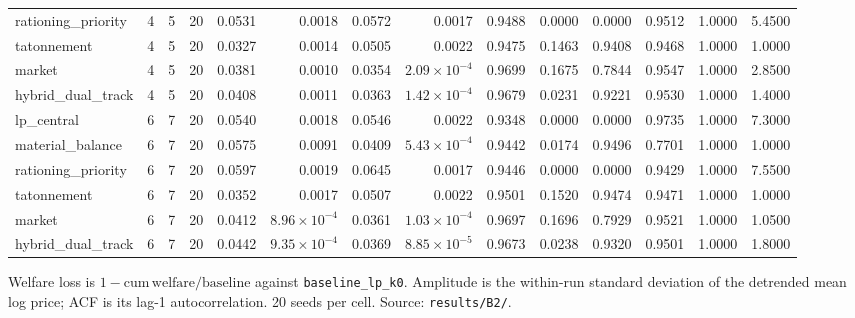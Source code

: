 \begin{table}[htbp]
\begin{tabular}{lrrrrrrrrrrrrr}
rationing\_priority & 4 & 5 & 20 & 0.0531 & 0.0018 & 0.0572 & 0.0017 & 0.9488 & 0.0000 & 0.0000 & 0.9512 & 1.0000 & 5.4500 \\
tatonnement & 4 & 5 & 20 & 0.0327 & 0.0014 & 0.0505 & 0.0022 & 0.9475 & 0.1463 & 0.9408 & 0.9468 & 1.0000 & 1.0000 \\
market & 4 & 5 & 20 & 0.0381 & 0.0010 & 0.0354 & $2.09\times10^{-4}$ & 0.9699 & 0.1675 & 0.7844 & 0.9547 & 1.0000 & 2.8500 \\
hybrid\_dual\_track & 4 & 5 & 20 & 0.0408 & 0.0011 & 0.0363 & $1.42\times10^{-4}$ & 0.9679 & 0.0231 & 0.9221 & 0.9530 & 1.0000 & 1.4000 \\
lp\_central & 6 & 7 & 20 & 0.0540 & 0.0018 & 0.0546 & 0.0022 & 0.9348 & 0.0000 & 0.0000 & 0.9735 & 1.0000 & 7.3000 \\
material\_balance & 6 & 7 & 20 & 0.0575 & 0.0091 & 0.0409 & $5.43\times10^{-4}$ & 0.9442 & 0.0174 & 0.9496 & 0.7701 & 1.0000 & 1.0000 \\
rationing\_priority & 6 & 7 & 20 & 0.0597 & 0.0019 & 0.0645 & 0.0017 & 0.9446 & 0.0000 & 0.0000 & 0.9429 & 1.0000 & 7.5500 \\
tatonnement & 6 & 7 & 20 & 0.0352 & 0.0017 & 0.0507 & 0.0022 & 0.9501 & 0.1520 & 0.9474 & 0.9471 & 1.0000 & 1.0000 \\
market & 6 & 7 & 20 & 0.0412 & $8.96\times10^{-4}$ & 0.0361 & $1.03\times10^{-4}$ & 0.9697 & 0.1696 & 0.7929 & 0.9521 & 1.0000 & 1.0500 \\
hybrid\_dual\_track & 6 & 7 & 20 & 0.0442 & $9.35\times10^{-4}$ & 0.0369 & $8.85\times10^{-5}$ & 0.9673 & 0.0238 & 0.9320 & 0.9501 & 1.0000 & 1.8000 \\
\bottomrule
\end{tabular}
\par\smallskip
\begin{minipage}{\linewidth}\footnotesize Welfare loss is $1-\mathrm{cum\,welfare}/\mathrm{baseline}$ against \texttt{baseline\_lp\_k0}. Amplitude is the within-run standard deviation of the detrended mean log price; ACF is its lag-1 autocorrelation. 20 seeds per cell. Source: \texttt{results/B2/}.\end{minipage}
\end{table}
